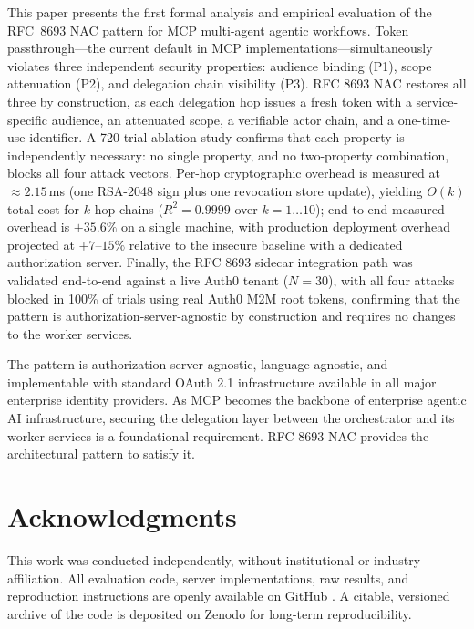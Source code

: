 \documentclass[journal]{IEEEtran}
\begin{document}
This paper presents the first formal analysis and empirical evaluation of the
RFC~8693 NAC pattern for MCP multi-agent agentic workflows. Token
passthrough---the current default in MCP implementations---simultaneously
violates three independent security properties: audience binding (P1), scope
attenuation (P2), and delegation chain visibility (P3). RFC 8693 NAC restores
all three by construction, as each delegation hop issues a fresh token with a
service-specific audience, an attenuated scope, a verifiable actor chain, and a
one-time-use identifier. A 720-trial ablation study confirms that each property
is independently necessary: no single property, and no two-property combination,
blocks all four attack vectors. Per-hop cryptographic overhead is measured at
$\approx 2.15$\,ms (one RSA-2048 sign plus one revocation store update),
yielding $O(k)$ total cost for $k$-hop chains ($R^2 = 0.9999$ over
$k=1\ldots10$); end-to-end measured overhead is $+35.6\%$ on a single machine,
with production deployment overhead projected at $+7$--$15\%$ relative to the
insecure baseline with a dedicated authorization server. Finally, the RFC 8693
sidecar integration path was validated end-to-end against a live Auth0 tenant
($N=30$), with all four attacks blocked in 100\% of trials using real Auth0 M2M
root tokens, confirming that the pattern is authorization-server-agnostic by
construction and requires no changes to the worker services.

The pattern is authorization-server-agnostic, language-agnostic, and
implementable with standard OAuth 2.1 infrastructure available in all major
enterprise identity providers. As MCP becomes the backbone of enterprise agentic
AI infrastructure, securing the delegation layer between the orchestrator and its
worker services is a foundational requirement. RFC 8693 NAC provides the
architectural pattern to satisfy it.

\FloatBarrier  %

\section*{Acknowledgments}
This work was conducted independently, without institutional or industry
affiliation. All evaluation code, server implementations, raw results, and
reproduction instructions are openly available on GitHub \cite{nac_mcp_impl}.
A citable, versioned archive of the code is deposited on Zenodo
\cite{nac_mcp_impl} for long-term reproducibility.
\end{document}
